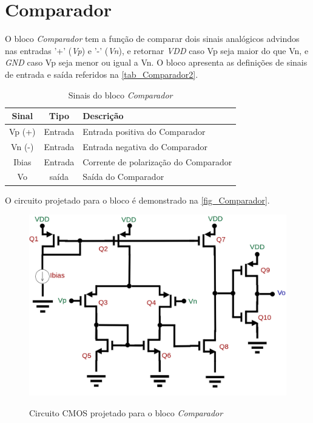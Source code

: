 \renewcommand{\NomeBloco}{\textit{Comparador}}
\renewcommand{\NomeBlocoNoIt}{Comparador}
\renewcommand{\NomePTab}{tab_\NomeBloco}
\renewcommand{\NomeSTab}{tab_\NomeBlocoNoIt2}
\renewcommand{\NomePFig}{fig_\NomeBlocoNoIt}
\renewcommand{\NomeSFig}{fig_\NomeBlocoNoIt2}
\renewcommand{\NomeTTab}{tab_\NomeBlocoNoIt3}

\section{Comparador}

O bloco \NomeBloco{} tem a função de comparar dois sinais anal\'ogicos advindos nas entradas '+' (\textit{Vp}) e '-' (\textit{Vn}), e retornar \textit{VDD} caso Vp seja maior do que Vn, e \textit{GND} caso Vp seja menor ou igual a Vn. O bloco apresenta as definições de sinais de entrada e sa\'ida referidos na \autoref{\NomeSTab}.

\begin{table}[!h]
\caption{Sinais do bloco \NomeBloco}
\label{\NomeSTab}
\centering
\begin{tabular}{ccl}

    \toprule
    Sinal & Tipo    & Descrição        \\
    \midrule \midrule
    Vp (+) & Entrada & Entrada positiva do Comparador\\
    \midrule
    Vn (-) & Entrada & Entrada negativa do Comparador\\
    \midrule
    Ibias & Entrada & Corrente de polarização do Comparador\\
    \midrule
    Vo & sa\'ida & Sa\'ida do Comparador\\
    \bottomrule
\end{tabular}
\end{table}

O circuito projetado para o bloco \'e demonstrado na \autoref{\NomePFig}.

\begin{figure}[!h]
 \centering
    \centering
    \caption{Circuito CMOS projetado para o bloco \NomeBloco} 
    \includegraphics[scale=0.3]{Circuitos/Comparator.png}
    \label{\NomePFig}
\end{figure}

